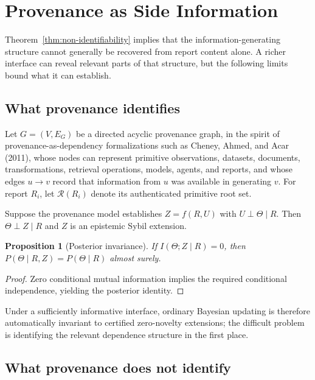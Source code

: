 \documentclass[11pt]{article}
\newtheorem{proposition}{Proposition}
\theoremstyle{definition}
\begin{document}
\section{Provenance as Side Information}
\label{sec:provenance}

Theorem~\ref{thm:non-identifiability} implies that the information-generating structure cannot generally be recovered from report content alone. A richer interface can reveal relevant parts of that structure, but the following limits bound what it can establish.

\subsection{What provenance identifies}
\label{sec:provenance-identifies}

Let $G=(V,E_G)$ be a directed acyclic provenance graph, in the spirit of provenance-as-dependency formalizations such as Cheney, Ahmed, and Acar (2011), whose nodes can represent primitive observations, datasets, documents, transformations, retrieval operations, models, agents, and reports, and whose edges $u\rightarrow v$ record that information from $u$ was available in generating $v$. For report $R_i$, let $\mathcal R(R_i)$ denote its authenticated primitive root set.

Suppose the provenance model establishes $Z=f(R,U)$ with $U\perp\Theta\mid R$. Then $\Theta\perp Z\mid R$ and $Z$ is an epistemic Sybil extension.

\begin{proposition}[Posterior invariance]
If $I(\Theta;Z\mid R)=0$, then $P(\Theta\mid R,Z)=P(\Theta\mid R)$ almost surely.
\end{proposition}

\begin{proof}
Zero conditional mutual information implies the required conditional independence, yielding the posterior identity.
\end{proof}

Under a sufficiently informative interface, ordinary Bayesian updating is therefore automatically invariant to certified zero-novelty extensions; the difficult problem is identifying the relevant dependence structure in the first place.

\subsection{What provenance does not identify}
\label{sec:provenance-limits}
\end{document}
